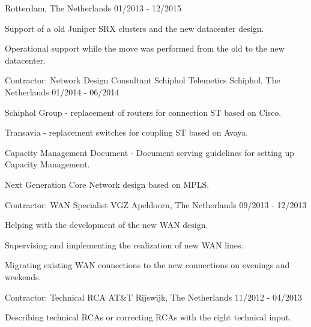 \begin{cventries}
    {Rotterdam, The Netherlands} %
    {01/2013 - 12/2015} %
    {
      \begin{cvitems} %
      \item {Support of a old Juniper SRX clusters and the new datacenter design.}
      \item {Operational support while the move was performed from the old to the new datacenter.}
      \end{cvitems}
    }
 \cventry
    {Contractor: Network Design Consultant} %
    {Schiphol Telemetics} %
    {Schiphol, The Netherlands} %
    {01/2014 - 06/2014} %
    {
      \begin{cvitems} %
      \item {Schiphol Group - replacement of routers for connection ST based on Cisco.}
      \item {Transavia - replacement switches for coupling ST based on Avaya.}
      \item {Capacity Management Document - Document serving guidelines for setting up Capacity Management.}
      \item {Next Generation Core Network design based on MPLS.}
      \end{cvitems}
    }
 \cventry
    {Contractor: WAN Specialist} %
    {VGZ} %
    {Apeldoorn, The Netherlands} %
    {09/2013 - 12/2013} %
    {
      \begin{cvitems} %
      \item {Helping with the development of the new WAN design.}
      \item {Supervising and implementing the realization of new WAN lines.}
	\item {Migrating existing WAN connections to the new connections on evenings and weekends}.
      \end{cvitems}
    }
 \cventry
    {Contractor: Technical RCA} %
    {AT\&T} %
    {Rijswijk, The Netherlands} %
    {11/2012 - 04/2013} %
    {
      \begin{cvitems} %
      \item {Describing technical RCAs or correcting RCAs with the right technical input.}
      \end{cvitems}
    }
\end{cventries}
